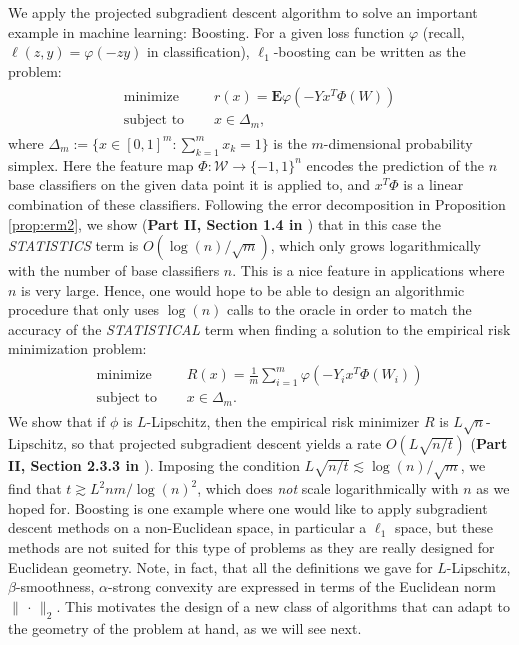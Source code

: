 We apply the projected subgradient descent algorithm to solve an important example in machine learning: Boosting. For a given loss function $\varphi$ (recall, $\ell(z,y) = \varphi(-zy)$ in classification), $\ell_1$-boosting can be written as the problem:
\begin{align*}
	\begin{aligned}
		\text{minimize }\quad   & r(x) = \mathbf{E} \varphi(-Yx^T\Phi(W))\\
		\text{subject to }\quad & x\in \Delta_m,
	\end{aligned}
\end{align*}
where $\Delta_m := \{x\in [0,1]^m : \sum_{k=1}^m x_k = 1\}$ is the $m$-dimensional probability simplex. Here the feature map $\Phi : \mathcal{W} \rightarrow \{-1,1\}^n$ encodes the prediction of the $n$ base classifiers on the given data point it is applied to, and $x^T\Phi$ is a linear combination of these classifiers. 
Following the error decomposition in Proposition \ref{prop:erm2}, we show (\textbf{Part II, Section 1.4 in \cite{rigollet}}) that in this case the \emph{STATISTICS} term is $O(\log(n)/\sqrt{m})$, which only grows logarithmically with the number of base classifiers $n$. This is a nice feature in applications where $n$ is very large. Hence, one would hope to be able to design an algorithmic procedure that only uses $\log(n)$ calls to the oracle in order to match the accuracy of the \emph{STATISTICAL} term when finding a solution to the empirical risk minimization problem:
\begin{align*}
	\begin{aligned}
		\text{minimize }\quad   & R(x) = \frac{1}{m} \sum_{i=1}^m \varphi(-Y_ix^T\Phi(W_i))\\
		\text{subject to }\quad & x\in \Delta_m.
	\end{aligned}
\end{align*}
We show that if $\phi$ is $L$-Lipschitz, then the empirical risk minimizer $R$ is $L\sqrt{n}$-Lipschitz, so that projected subgradient descent yields a rate $O(L\sqrt{n/t})$ (\textbf{Part II, Section 2.3.3 in \cite{rigollet}}). Imposing the condition $L\sqrt{n/t} \lesssim \log(n)/\sqrt{m}$, we find that $t\gtrsim L^2 nm/\log(n)^2$, which does \emph{not} scale logarithmically with $n$ as we hoped for. Boosting is one example where one would like to apply subgradient descent methods on a non-Euclidean space, in particular a $\ell_1$ space, but these methods are not suited for this type of problems as they are really designed for Euclidean geometry. Note, in fact, that all the definitions we gave for $L$-Lipschitz, $\beta$-smoothness, $\alpha$-strong convexity are expressed in terms of the Euclidean norm $\|\,\cdot\,\|_2$. This motivates the design of a new class of algorithms that can adapt to the geometry of the problem at hand, as we will see next.


